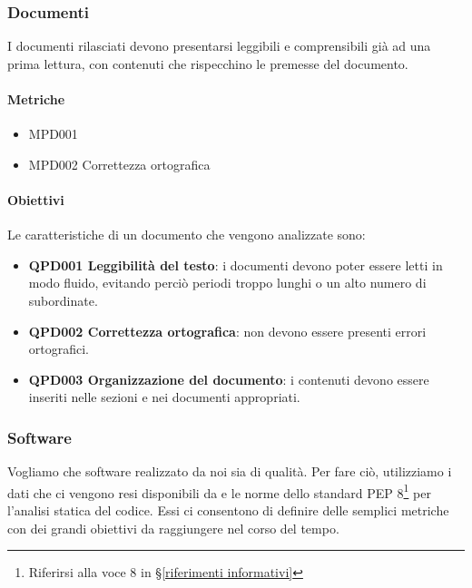 	\subsubsection{Documenti}
	I documenti rilasciati devono presentarsi leggibili e comprensibili già ad una prima lettura, con contenuti che rispecchino le premesse del documento.

		\paragraph{Metriche}
		\begin{itemize}
			\item MPD001 
			\item MPD002 Correttezza ortografica
		\end{itemize}

		\paragraph{Obiettivi}
		Le caratteristiche di un documento che vengono analizzate sono:

		\begin{itemize}
			\item \textbf{QPD001 Leggibilità del testo}: i documenti devono poter essere letti in modo fluido, evitando perciò periodi troppo lunghi o un alto numero di subordinate.
			\item \textbf{QPD002 Correttezza ortografica}: non devono essere presenti errori ortografici.
			\item \textbf{QPD003 Organizzazione del documento}: i contenuti devono essere inseriti nelle sezioni e nei documenti appropriati.
		\end{itemize}

	\subsubsection{Software} \label{prodottosw}
	Vogliamo che software realizzato da noi sia di qualità.
	Per fare ciò, utilizziamo i dati che ci vengono resi disponibili da  e le norme dello standard PEP 8\footnote{Riferirsi alla voce 8 in \S\ref{riferimenti informativi}} per l'analisi statica del codice.
	Essi ci consentono di definire delle semplici metriche con dei grandi obiettivi da raggiungere nel corso del tempo.

